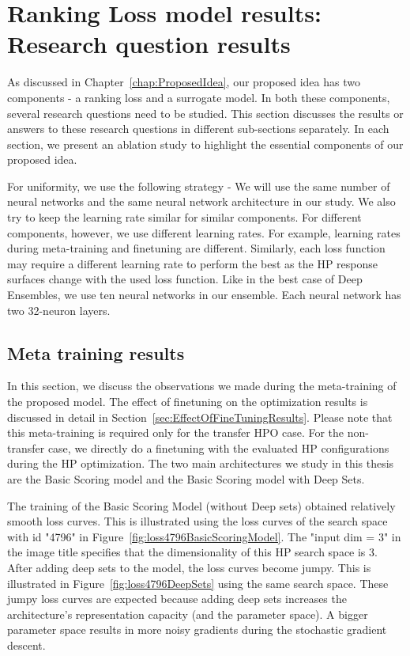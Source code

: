 \documentclass[12pt, twoside, ngerman]{report}
\begin{document}
\section{Ranking Loss model results: Research question results}

As discussed in Chapter~\ref{chap:ProposedIdea},  our proposed idea has two components - a ranking loss and a surrogate model.
In both these components, several research questions need to be studied.
This section discusses the results or answers to these research questions in different sub-sections separately.
In each section, we present an ablation study to highlight the essential components of our proposed idea.

For uniformity, we use the following strategy - We will use the same number of neural networks and the same neural network architecture in our study.
We also try to keep the learning rate similar for similar components.
For different components, however, we use different learning rates.
For example, learning rates during meta-training and finetuning are different.
Similarly, each loss function may require a different learning rate to perform the best as the HP response surfaces change with the used loss function.
Like in the best case of Deep Ensembles, we use ten neural networks in our ensemble. Each neural network has two 32-neuron layers.

\subsection{Meta training results}
In this section, we discuss the observations we made during the meta-training of the proposed model. The effect of finetuning on the optimization results is discussed in detail in Section~\ref{sec:EffectOfFineTuningResults}. Please note that this meta-training is required only for the transfer HPO case. For the non-transfer case, we directly do a finetuning with the evaluated HP configurations during the HP optimization.
The two main architectures we study in this thesis are the Basic Scoring model and the Basic Scoring model with Deep Sets. 

The training of the Basic Scoring Model (without Deep sets) obtained relatively smooth loss curves. This is illustrated using the loss curves of the search space with id "4796" in Figure~\ref{fig:loss4796BasicScoringModel}. The "input dim = 3" in the image title specifies that the dimensionality of this HP search space is 3. After adding deep sets to the model, the loss curves become jumpy. This is illustrated in Figure~\ref{fig:loss4796DeepSets} using the same search space. These jumpy loss curves are expected because adding deep sets increases the architecture's representation capacity (and the parameter space). A bigger parameter space results in more noisy gradients during the stochastic gradient descent. 
\end{document}
